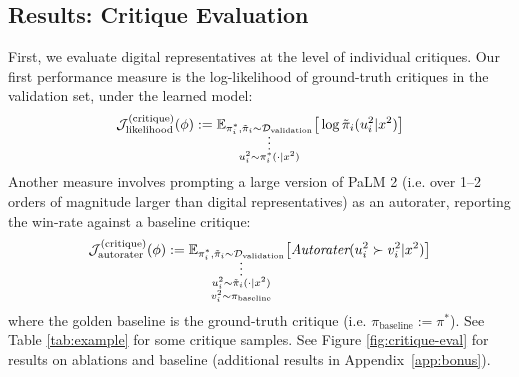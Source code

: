 \subsection{Results: Critique Evaluation}

First, we evaluate digital representatives at the level of individual critiques. Our first performance measure is the log-likelihood of ground-truth critiques in the validation set, under the learned model:
%
\begin{equation}
\mathcal{J}_{\text{likelihood}}^{(\text{critique})}
(\phi)
:=
\mathbb{E}_{\substack{
\pi_{i}^{*},\tilde{\pi}_{i}\sim\mathcal{D}_{\text{validation}}\vspace{-5pt}\\
\vdots\\
u_{i}^{2}\sim\pi_{i}^{*}(\cdot|x^{2})
}}
\big[
\log\tilde{\pi}_{i}(u_{i}^{2}|x^{2})
\big]
\end{equation}
%
Another measure involves prompting a large version of PaLM 2 \cite{anil2023palm} (i.e. over 1--2 orders of magnitude larger than digital representatives) as an autorater, reporting the win-rate against a baseline critique:
%
\begin{equation}
\mathcal{J}_{\text{autorater}}^{(\text{critique})}
(\phi)
:=
\mathbb{E}_{\substack{
\pi_{i}^{*},\tilde{\pi}_{i}\sim\mathcal{D}_{\text{validation}}\vspace{-5pt}\\
\vdots\\
u_{i}^{2}\sim\tilde{\pi}_{i}(\cdot|x^{2})\\
v_{i}^{2}\sim\pi_{\text{baseline}}
}}
\big[
\textit{Autorater}(u_{i}^{2}\succ v_{i}^{2}|x^{2})
\big]
\end{equation}
%
where the golden baseline is the ground-truth critique (i.e. $\pi_{\text{baseline}}:=\pi^{*}$). See Table \ref{tab:example} for some critique samples. See Figure \ref{fig:critique-eval} for results on ablations and baseline (additional results in Appendix~\ref{app:bonus}).


